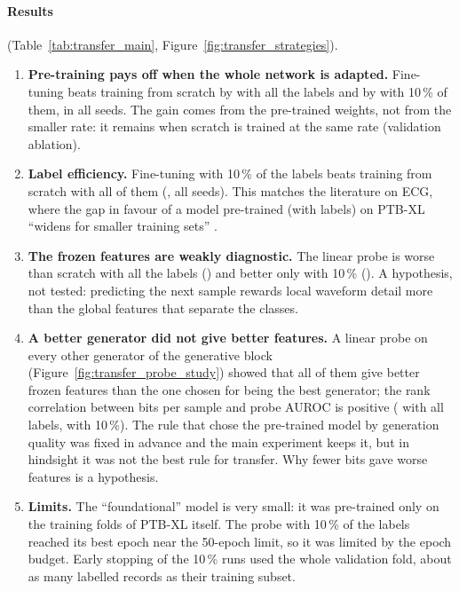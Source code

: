 \paragraph{Results} (Table~\ref{tab:transfer_main}, Figure~\ref{fig:transfer_strategies}).
\begin{enumerate}[leftmargin=1.4em,itemsep=2pt]
  \item \textbf{Pre-training pays off when the whole network is adapted.} Fine-tuning beats training from
        scratch by \transferTestDiffMeanFinetuneVsScratchFOneZeroZero{} with all the labels and by
        \transferTestDiffMeanFinetuneVsScratchFOneZero{} with 10\,\% of them, in all seeds. The gain
        comes from the pre-trained weights, not from the smaller rate: it remains when scratch is trained
        at the same rate (validation ablation).
  \item \textbf{Label efficiency.} Fine-tuning with 10\,\% of the labels beats training from scratch with
        all of them (\transferTestDiffMeanFinetuneFOneZeroVsScratchFOneZeroZero{}, all seeds). This
        matches the literature on ECG, where the gap in favour of a model pre-trained (with labels) on PTB-XL ``widens for smaller training
        sets'' \cite[p.~1524]{strodthoff2021deep}.
  \item \textbf{The frozen features are weakly diagnostic.} The linear probe is worse than scratch with
        all the labels (\transferTestDiffMeanProbeVsScratchFOneZeroZero{}) and better only with 10\,\%
        (\transferTestDiffMeanProbeVsScratchFOneZero{}). A hypothesis, not tested: predicting the next
        sample rewards local waveform detail more than the global features that separate the classes.
  \item \textbf{A better generator did not give better features.} A linear probe on every other generator
        of the generative block (Figure~\ref{fig:transfer_probe_study}) showed that all of them give better
        frozen features than the one chosen for being the best generator; the rank correlation between
        bits per sample and probe AUROC is positive (\transferProbeSpearmanFOneZeroZero{} with all labels,
        \transferProbeSpearmanFOneZero{} with 10\,\%). The rule that chose the pre-trained model by
        generation quality was fixed in advance and the main experiment keeps it, but in hindsight it was
        not the best rule for transfer. Why fewer bits gave worse features is a hypothesis.
  \item \textbf{Limits.} The ``foundational'' model is very small: it was pre-trained only on the
        training folds of PTB-XL itself. The probe with 10\,\% of the labels reached its best epoch near
        the 50-epoch limit, so it was limited by the epoch budget. Early stopping of the 10\,\% runs used
        the whole validation fold, about as many labelled records as their training subset.
\end{enumerate}

